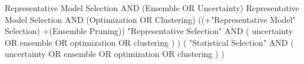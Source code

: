 Representative Model Selection AND (Ensemble OR Uncertainty)
Representative Model Selection AND (Optimization OR Clustering)
((+"Representative Model" Selection) +(Ensemble Pruning))
 "Representative Selection"  AND  ( uncertainty  OR  ensemble  OR  optimization  OR  clustering ) ) 
 ( "Statistical Selection"  AND  ( uncertainty  OR  ensemble  OR  optimization  OR  clustering ) )
